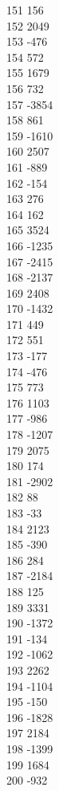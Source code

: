 { 151	156 \\
 152	2049 \\
 153	-476 \\
 154	572 \\
 155	1679 \\
 156	732 \\
 157	-3854 \\
 158	861 \\
 159	-1610 \\
 160	2507 \\
 161	-889 \\
 162	-154 \\
 163	276 \\
 164	162 \\
 165	3524 \\
 166	-1235 \\
 167	-2415 \\
 168	-2137 \\
 169	2408 \\
 170	-1432 \\
 171	449 \\
 172	551 \\
 173	-177 \\
 174	-476 \\
 175	773 \\
 176	1103 \\
 177	-986 \\
 178	-1207 \\
 179	2075 \\
 180	174 \\
 181	-2902 \\
 182	88 \\
 183	-33 \\
 184	2123 \\
 185	-390 \\
 186	284 \\
 187	-2184 \\
 188	125 \\
 189	3331 \\
 190	-1372 \\
 191	-134 \\
 192	-1062 \\
 193	2262 \\
 194	-1104 \\
 195	-150 \\
 196	-1828 \\
 197	2184 \\
 198	-1399 \\
 199	1684 \\
 200	-932 \\
}
